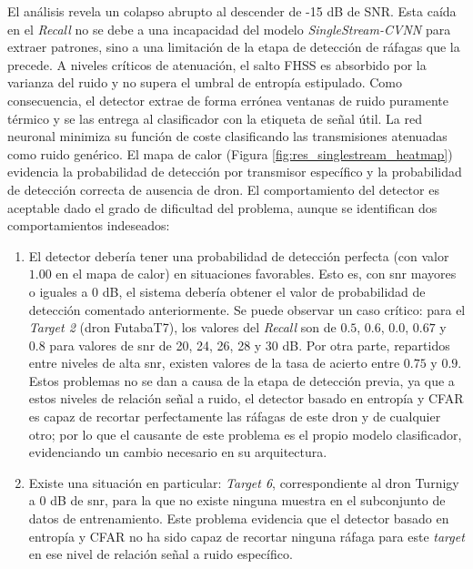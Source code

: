 El análisis revela un colapso abrupto al descender de -15 dB de SNR. Esta caída en el \textit{Recall} no se debe a una incapacidad del modelo \textit{SingleStream-CVNN} para extraer patrones, sino a una limitación de la etapa de detección de ráfagas que la precede. A niveles críticos de atenuación, el salto FHSS es absorbido por la varianza del ruido y no supera el umbral de entropía estipulado. Como consecuencia, el detector extrae de forma errónea ventanas de ruido puramente térmico y se las entrega al clasificador con la etiqueta de señal útil. La red neuronal minimiza su función de coste clasificando las transmisiones atenuadas como ruido genérico. 
El mapa de calor (Figura \ref{fig:res_singlestream_heatmap}) evidencia la probabilidad de detección por transmisor específico y la probabilidad de detección correcta de ausencia de dron. El comportamiento del detector es aceptable dado el grado de dificultad del problema, aunque se identifican dos comportamientos indeseados:

\begin{enumerate}\itemsep 0em
    \item El detector debería tener una probabilidad de detección perfecta (con valor $1.00$ en el mapa de calor) en situaciones favorables. Esto es, con \gls{snr} mayores o iguales a $0$ dB, el sistema debería obtener el valor de probabilidad de detección comentado anteriormente. Se puede observar un caso crítico: para el \textit{Target 2} (dron FutabaT7), los valores del \textit{Recall} son de $0.5$, $0.6$, $0.0$, $0.67$ y $0.8$ para valores de \gls{snr} de 20, 24, 26, 28 y 30 dB. Por otra parte, repartidos entre niveles de alta \gls{snr}, existen valores de la tasa de acierto entre $0.75$ y $0.9$. Estos problemas no se dan a causa de la etapa de detección previa, ya que a estos niveles de relación señal a ruido, el detector basado en entropía y CFAR es capaz de recortar perfectamente las ráfagas de este dron y de cualquier otro; por lo que el causante de este problema es el propio modelo clasificador, evidenciando un cambio necesario en su arquitectura.

    \item Existe una situación en particular: \textit{Target 6}, correspondiente al dron Turnigy a $0$ dB de \gls{snr}, para la que no existe ninguna muestra en el subconjunto de datos de entrenamiento. Este problema evidencia que el detector basado en entropía y CFAR no ha sido capaz de recortar ninguna ráfaga para este \textit{target} en ese nivel de relación señal a ruido específico. 
\end{enumerate}

